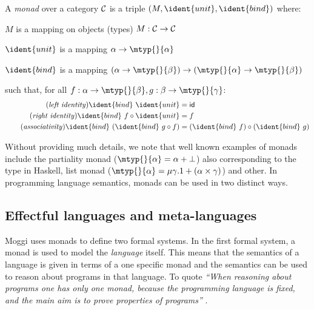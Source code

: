 \begin{definition}
A \emph{monad} over a category $\mathcal{C}$ is a triple $(M, \ident{unit}, \ident{bind})$ where:
\begin{compactitem}
\item $M$ is a mapping on objects (types) $M : \mathcal{C} \rightarrow \mathcal{C}$
\item $\ident{unit}$ is a mapping $\alpha \rightarrow \mtyp{}{\alpha}$ 
\item $\ident{bind}$ is a mapping $(\alpha \rightarrow \mtyp{}{\beta}) 
  \rightarrow (\mtyp{}{\alpha} \rightarrow \mtyp{}{\beta})$
\end{compactitem}
such that, for all $f:\alpha \rightarrow \mtyp{}{\beta}, g:\beta \rightarrow \mtyp{}{\gamma}$:
\begin{align}
\tag{\emph{left identity}}
  \ident{bind}~\ident{unit} &= \idf{}
  \\
\tag{\emph{right identity}}
  \ident{bind}~f \circ \ident{unit} &= f
  \\
\tag{\emph{associativity}}
  \ident{bind}~(\ident{bind}~g \circ f) &= (\ident{bind}~f) \circ (\ident{bind}~g)
\end{align}
\end{definition}

\noindent
Without providing much details, we note that well known examples of monads include the partiality
monad ($\mtyp{}{\alpha} = \alpha + {\bot}$) also corresponding to the  type in 
Haskell, list monad ($\mtyp{}{\alpha} = \mu \gamma.1 + (\alpha \times \gamma)$) and other.
In programming language semantics, monads can be used in two distinct ways.


\subsection{Effectful languages and meta-languages}

Moggi uses monads to define two formal systems. In the first formal system, a monad is used to model 
the \emph{language} itself. This means that the semantics of a language is given in terms of a 
one specific monad and the semantics can be used to reason about programs in that language. To quote 
\emph{``When reasoning about programs one has only one monad, because the programming language is 
fixed, and the main aim is to prove properties of programs''} \cite[p. 5]{monad-notions}.

